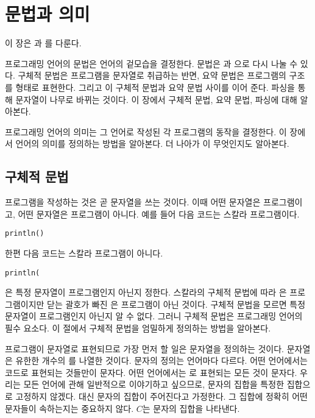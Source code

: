 \chapter{문법과 의미}

\renewcommand{\Lang}{\code{AE}}

이 장은 과 를 다룬다.

프로그래밍 언어의 문법은 언어의 겉모습을 결정한다. 문법은 과 으로 다시 나눌 수
있다. 구체적 문법은 프로그램을 문자열로 취급하는 반면, 요약 문법은 프로그램의
구조를  형태로 표현한다. 그리고 이 구체적
문법과 요약 문법 사이를 이어 준다. 파싱을 통해 문자열이 나무로 바뀌는 것이다. 이
장에서 구체적 문법, 요약 문법, 파싱에 대해 알아본다.

프로그래밍 언어의 의미는 그 언어로 작성된 각 프로그램의 동작을 결정한다. 이
장에서 언어의 의미를 정의하는 방법을 알아본다. 더 나아가 이 무엇인지도 알아본다.

\section{구체적 문법}

프로그램을 작성하는 것은 곧 문자열을 쓰는 것이다. 이때 어떤 문자열은
프로그램이고, 어떤 문자열은 프로그램이 아니다. 예를 들어 다음 코드는 스칼라
프로그램이다.

\begin{verbatim}
println()
\end{verbatim}

한편 다음 코드는 스칼라 프로그램이 아니다.

\begin{verbatim}
println(
\end{verbatim}

은 특정 문자열이 프로그램인지 아닌지 정한다. 스칼라의 구체적 문법에
따라 은 프로그램이지만 닫는 괄호가 빠진 은
프로그램이 아닌 것이다. 구체적 문법을 모르면 특정 문자열이 프로그램인지 아닌지
알 수 없다. 그러니 구체적 문법은 프로그래밍 언어의 필수 요소다. 이 절에서 구체적
문법을 엄밀하게 정의하는 방법을 알아본다.

프로그램이 문자열로 표현되므로 가장 먼저 할 일은 문자열을 정의하는 것이다.
문자열은 유한한 개수의 를 나열한 것이다. 문자의 정의는 언어마다
다르다. 어떤 언어에서는  코드로 표현되는 것들만이 문자다. 어떤
언어에서는 로 표현되는 모든 것이 문자다. 우리는 모든 언어에 관해
일반적으로 이야기하고 싶으므로, 문자의 집합을 특정한 집합으로 고정하지 않겠다.
대신 문자의 집합이 주어진다고 가정한다. 그 집합에 정확히 어떤 문자들이
속하는지는 중요하지 않다. $C$는 문자의 집합을 나타낸다.

